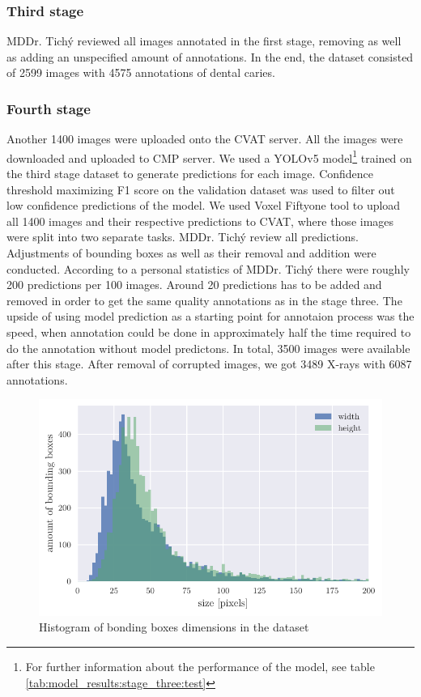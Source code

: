 \subsubsection{Third stage}
MDDr. Tichý reviewed all images annotated in the first stage, removing as well as adding an unspecified amount of annotations. In the end, the dataset consisted of 2599 images with 4575 annotations of dental caries.

\subsubsection{Fourth stage}
Another 1400 images were uploaded onto the CVAT server. All the images were downloaded and uploaded to CMP server. We used a  YOLOv5 model\footnote{For further information about the performance of the model, see table \ref{tab:model_results:stage_three:test}} trained on the third stage dataset to generate predictions for each image. Confidence threshold maximizing F1 score on the validation dataset was used to filter out low confidence predictions of the model. We used Voxel Fiftyone tool to upload all 1400 images and their respective predictions to CVAT, where those images were split into two separate tasks.
MDDr. Tichý review all predictions. Adjustments of bounding boxes as well as their removal and addition were conducted. According to a personal statistics of MDDr. Tichý there were roughly 200 predictions per 100 images. Around 20 predictions has to be added and removed in order to get the same quality annotations as in the stage three. The upside of using model prediction as a starting point for annotaion process was the speed, when annotation could be done in approximately half the time required to do the annotation without model predictons. In total, 3500 images were available after this stage. After removal of corrupted images, we got 3489 X-rays with 6087 annotations.

\begin{figure}
    \includegraphics[width = \linewidth]{images/dataset_histogram.pdf}
    \caption{Histogram of bonding boxes dimensions in the dataset}
    \label{fig:hist_caries_dim}
\end{figure}

